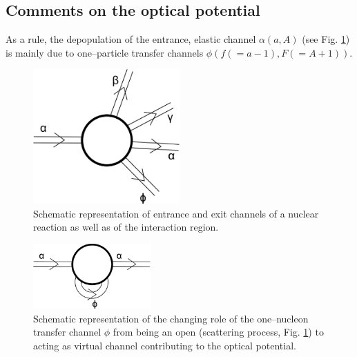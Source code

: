 \documentclass[a4paper,11pt]{book}
\numberwithin{equation}{section}
\numberwithin{figure}{section}
\numberwithin{table}{section}
\begin{document}
\begin{subappendices}
\section{Comments on the optical potential}
As a rule, the depopulation of the entrance, elastic channel $\alpha (a,A)$ (see Fig. \ref{fig_2}) is mainly due to one--particle transfer channels $\phi (f(=a-1),F(=A+1))$.
\begin{figure}
\centerline{\includegraphics*[width=0.5\textwidth,angle=0]{figs/fig_2.pdf}}
\caption{Schematic representation of entrance and exit channels of a nuclear reaction as well as of the interaction region.}\label{fig_2}
\end{figure}
\begin{figure}
\centerline{\includegraphics*[width=0.4\textwidth,angle=0]{figs/fig_3.pdf}}
\caption{Schematic representation of the changing role of the one--nucleon transfer channel $\phi$ from being an open (scattering process, Fig. \ref{fig_2}) to acting as virtual channel contributing to the optical potential.}\label{fig_3}
\end{figure}

\end{subappendices}
\end{document}
